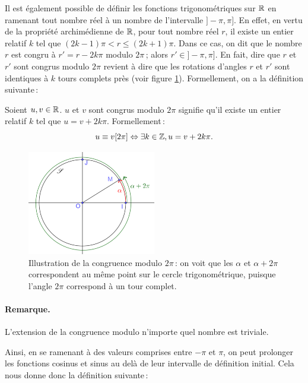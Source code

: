 		Il est également possible de définir les fonctions trigonométriques sur $\mathbb{R}$ en ramenant tout nombre réel à un nombre de l'intervalle $]-\pi,\pi]$. En effet, en vertu de la propriété archimédienne de $\mathbb{R}$, pour tout nombre réel $r$, il existe un entier relatif $k$ tel que $(2k-1)\pi<r\le (2k+1)\pi$. Dans ce cas, on dit que le nombre $r$ est congru à $r'=r-2k\pi$ modulo $2\pi$\,; alors $r'\in]-\pi,\pi]$. En fait, dire que $r$ et $r'$ sont congrus modulo $2\pi$ revient à dire que les rotations d'angles $r$ et $r'$ sont identiques à $k$ tours complets près (voir figure \ref{fig_congr}). Formellement, on a la définition suivante\,:
		\begin{defi}
			Soient $u,v\in\mathbb{R}$. $u$ et $v$ sont congrus modulo $2\pi$ signifie qu'il existe un entier relatif $k$ tel que $u=v+2k\pi$. Formellement\,:
			\begin{equation}
				u\equiv v [2\pi] \Leftrightarrow \exists k\in\mathbb{Z}, u=v+2k\pi.
			\end{equation}
		\end{defi}

		\begin{figure}
			\includegraphics[width=0.5\textwidth]{image/fct_trigo/congr.png}
			\caption{Illustration de la congruence modulo $2\pi$\,: on voit que les $\alpha$ et $\alpha+2\pi$ correspondent au même point sur le cercle trigonométrique, puisque l'angle $2\pi$ correspond à un tour complet.}
			\label{fig_congr}
		\end{figure}

		\paragraph{Remarque.} L'extension de la congruence modulo n'importe quel nombre est triviale.


		Ainsi, en se ramenant à des valeurs comprises entre $-\pi$ et $\pi$, on peut prolonger les fonctions cosinus et sinus au delà de leur intervalle de définition initial. Cela nous donne donc la définition suivante\,:

